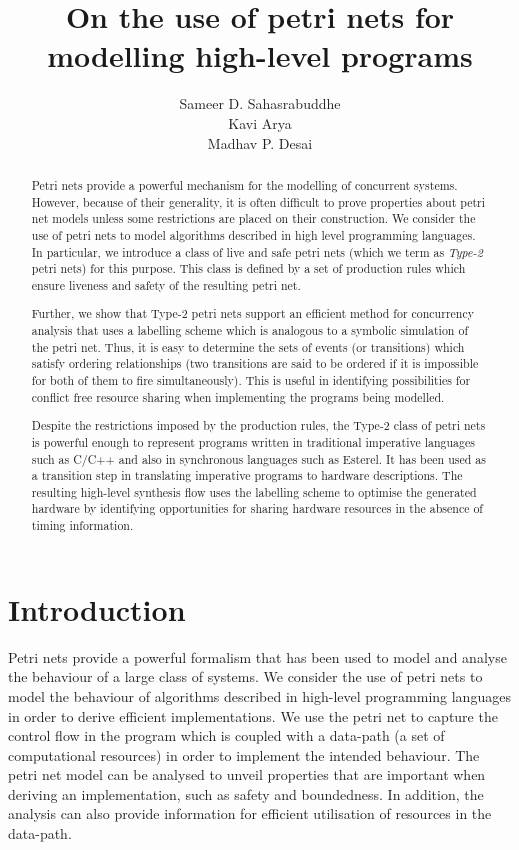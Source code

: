 \documentclass[12pt,a4paper]{article}
\title{On the use of petri nets for modelling high-level programs}
\author{Sameer D. Sahasrabuddhe \\ Kavi Arya \\ Madhav P. Desai}
\date{}
\begin{document}
\maketitle

\begin{abstract}

  Petri nets provide a powerful mechanism for the modelling of
  concurrent systems. However, because of their generality, it is
  often difficult to prove properties about petri net models unless
  some restrictions are placed on their construction. We consider the
  use of petri nets to model algorithms described in high level
  programming languages. In particular, we introduce a class of live
  and safe petri nets (which we term as {\em Type-2} petri nets) for
  this purpose. This class is defined by a set of production rules
  which ensure liveness and safety of the resulting petri net.
  
  Further, we show that Type-2 petri nets support an efficient method
  for concurrency analysis that uses a labelling scheme which is
  analogous to a symbolic simulation of the petri net. Thus, it is
  easy to determine the sets of events (or transitions) which satisfy
  ordering relationships (two transitions are said to be ordered if it
  is impossible for both of them to fire simultaneously). This is
  useful in identifying possibilities for conflict free resource
  sharing when implementing the programs being modelled.

  Despite the restrictions imposed by the production rules, the Type-2
  class of petri nets is powerful enough to represent programs written
  in traditional imperative languages such as C/C++ and also in
  synchronous languages such as Esterel. It has been used as a
  transition step in translating imperative programs to hardware
  descriptions\cite{ahir-thesis}. The resulting high-level synthesis
  flow uses the labelling scheme to optimise the generated hardware by
  identifying opportunities for sharing hardware resources in the
  absence of timing information.

\end{abstract}

\section{Introduction}
\label{sec:introduction}

Petri nets provide a powerful formalism that has been used to model
and analyse the behaviour of a large class of systems. We consider the
use of petri nets to model the behaviour of algorithms described in
high-level programming languages in order to derive efficient
implementations. We use the petri net to capture the control flow in
the program which is coupled with a data-path (a set of computational
resources) in order to implement the intended behaviour. The petri net
model can be analysed to unveil properties that are important when
deriving an implementation, such as safety and boundedness. In
addition, the analysis can also provide information for efficient
utilisation of resources in the data-path.
\end{document}
